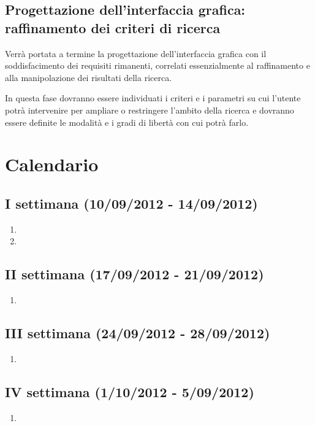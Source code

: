 \documentclass[10pt,a4paper,hidelinks]{scrartcl} %
\begin{document}
	\subsection{Progettazione dell'interfaccia grafica: raffinamento dei criteri di ricerca}
	\label{sec:stage:wp:ui:advanced-design}
	Verrà portata a termine la progettazione dell'interfaccia grafica con il soddisfacimento dei requisiti rimanenti, correlati essenzialmente al raffinamento e alla manipolazione dei risultati della ricerca.

	In questa fase dovranno essere individuati i criteri e i parametri su cui l'utente potrà intervenire per ampliare o restringere l'ambito della ricerca e dovranno essere definite le modalità e i gradi di libertà con cui potrà farlo.

	\section{Calendario}
	
	\subsection*{I settimana (10/09/2012 - 14/09/2012)}
	\begin{enumerate}
	\item {}
	\item {}
	\end{enumerate}
	\subsection*{II settimana (17/09/2012 - 21/09/2012)}
	\begin{enumerate}
	\item {}
	\end{enumerate}
	\subsection*{III settimana (24/09/2012 - 28/09/2012)}
	\begin{enumerate}
	\item {}
	\end{enumerate}
	\subsection*{IV settimana (1/10/2012 - 5/09/2012)}
	\begin{enumerate}
	\item {}
	\end{enumerate}
\end{document}
